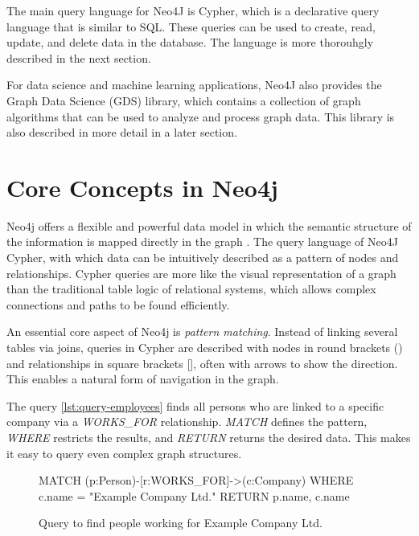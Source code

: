 \documentclass[english,smartquotes,apa]{hgbreport}
\begin{document}
The main query language for Neo4J is Cypher, which is a declarative query language that is similar to SQL. These queries can be used to create, read, update, and delete data in the database. The language is more thorouhgly described in the next section.

For data science and machine learning applications, Neo4J also provides the Graph Data Science (GDS) library, which contains a collection of graph algorithms that can be used to analyze and process graph data. This library is also described in more detail in a later section.


\section*{Core Concepts in Neo4j}

Neo4j offers a flexible and powerful data model in which the semantic structure of the information is mapped directly in the graph \parencite{robinson2015graph}. The query language of Neo4J Cypher, with which data can be intuitively described as a pattern of nodes and relationships. Cypher queries are more like the visual representation of a graph than the traditional table logic of relational systems, which allows complex connections and paths to be found efficiently.

An essential core aspect of Neo4j is \emph{pattern matching}. Instead of linking several tables via joins, queries in Cypher are described with nodes in round brackets () and relationships in square brackets [], often with arrows to show the direction. This enables a natural form of navigation in the graph. 

The query \autoref{lst:query-employees} finds all persons who are linked to a specific company via a \emph{WORKS\_FOR} relationship. \emph{MATCH} defines the pattern, \emph{WHERE} restricts the results, and \emph{RETURN} returns the desired data. This makes it easy to query even complex graph structures.

\begin{figure}[h]
	\begin{GenericCode}[numbers=none]
	MATCH (p:Person)-[r:WORKS_FOR]->(c:Company)
	WHERE c.name = "Example Company Ltd."
	RETURN p.name, c.name
	\end{GenericCode}
	\caption{Query to find people working for Example Company Ltd.}
	\label{lst:query-employees}
\end{figure}
\end{document}
